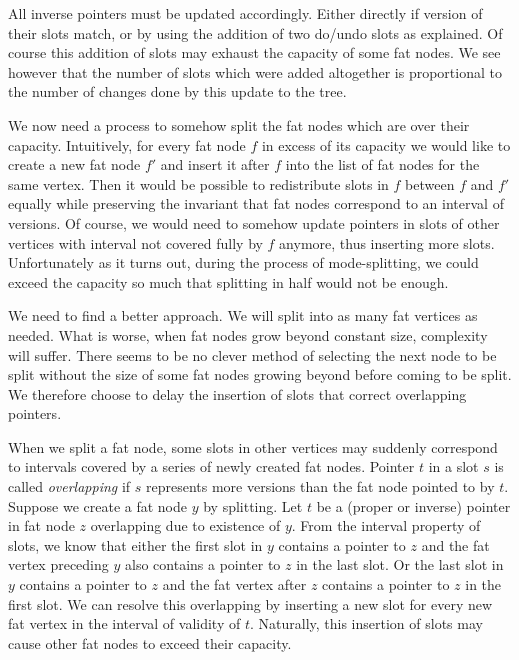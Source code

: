 All inverse pointers must be updated accordingly. Either directly if version of their slots match, or by using the addition of two do/undo slots as explained. Of course this addition of slots may exhaust the capacity of some fat nodes. We see however that the number of slots which were added altogether is proportional to the number of changes done by this update to the tree. 

We now need a process to somehow split the fat nodes which are over their capacity. 
Intuitively, for every fat node $f$ in excess of its capacity we would like to create a new fat node $f'$ and insert it after $f$ into the list of fat nodes for the same vertex. 
Then it would be possible to redistribute slots in $f$ between $f$ and $f'$ equally while preserving the invariant that fat nodes correspond to an interval of versions.
Of course, we would need to somehow update pointers in slots of other vertices with interval not covered fully by $f$ anymore, thus inserting more slots.
Unfortunately as it turns out, during the process of mode-splitting, we could exceed the capacity so much that splitting in half would not be enough. 

We need to find a better approach. 
We will split into as many fat vertices as needed. 
What is worse, when fat nodes grow beyond constant size, complexity will suffer. 
There seems to be no clever method of selecting the next node to be split without the size of some fat nodes growing beyond  before coming to be split. 
We therefore choose to delay the insertion of slots that correct overlapping pointers.

When we split a fat node, some slots in other vertices may suddenly correspond to intervals covered by a series of newly created fat nodes. Pointer $t$ in a slot $s$ is called \emph{overlapping} if $s$ represents more versions than the fat node pointed to by $t$.
Suppose we create a fat node $y$ by splitting. 
Let $t$ be a (proper or inverse) pointer in fat node $z$ overlapping due to existence of $y$. 
From the interval property of slots, we know that either the first slot in $y$ contains a pointer to $z$ and the fat vertex preceding $y$ also contains a pointer to $z$ in the last slot. 
Or the last slot in $y$ contains a pointer to $z$ and the fat vertex after $z$ contains a pointer to $z$ in the first slot. 
We can resolve this overlapping by inserting a new slot for every new fat vertex in the interval of validity of $t$. 
Naturally, this insertion of slots may cause other fat nodes to exceed their capacity. 


